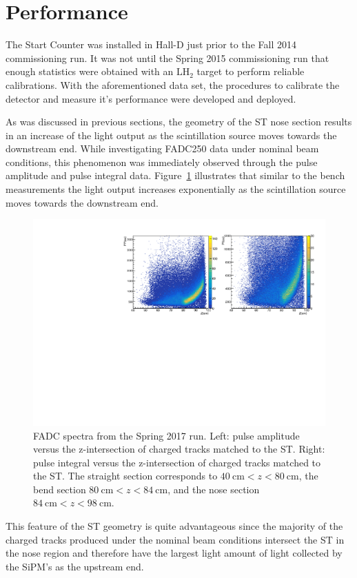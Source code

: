 \section{Performance} \label{sec:perform}

The Start Counter was installed in Hall-D just prior to the Fall 2014 \gx{} commissioning run.  It was not until the Spring 2015 commissioning run that enough statistics were obtained with an $\mathrm{LH_{2}}$ target to perform reliable calibrations.  With the aforementioned data set, the procedures to calibrate the detector and measure it's performance were developed and deployed.

As was discussed in previous sections, the geometry of the ST nose section results in an increase of the light output as the scintillation source moves towards the downstream end.  While investigating FADC250 data under nominal beam conditions, this phenomenon was immediately observed through the pulse amplitude and pulse integral data. Figure~\ref{fig:pippvszint} illustrates that similar to the bench measurements the light output increases exponentially as the scintillation source moves towards the downstream end.
	\begin{figure}[!htb]
		\centering
		\includegraphics[width=1.0\textwidth]{performance/figs/pp_z}
		\caption{FADC spectra from the Spring 2017 run. Left: pulse amplitude versus the z-intersection of charged tracks matched to the ST. Right: pulse integral versus the z-intersection of charged tracks matched to the ST. The straight section corresponds to $40\ \mathrm{cm} < z < 80\ \mathrm{cm}$, the bend section $80\ \mathrm{cm} < z < 84\ \mathrm{cm}$, and the nose section $84\ \mathrm{cm} < z < 98\ \mathrm{cm}$.}
		\label{fig:pippvszint}
	\end{figure}
This feature of the ST geometry is quite advantageous since the majority of the charged tracks produced under the nominal \gx{} beam conditions intersect the ST in the nose region and therefore have the largest light amount of light collected by the SiPM's as the upstream end.

